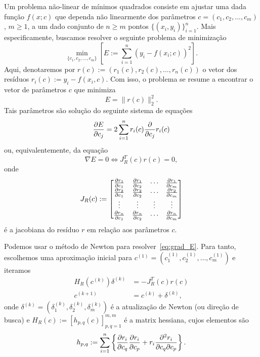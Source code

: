 Um problema não-linear de mínimos quadrados consiste em ajustar uma dada função $f(x;c)$ que dependa não linearmente dos parâmetros $c = (c_1, c_2, \dotsc, c_m)$, $m\geq 1$, a um dado conjunto de $n\geq m$ pontos $\{(x_i, y_i)\}_{i=1}^n$. Mais especificamente, buscamos resolver o seguinte problema de minimização
\begin{equation}\label{eq:prob_nlin_mq}
  \min_{\{c_1, c_2, \dotsc, c_m\}} \left[E := \sum_{i=1}^n \left(y_i - f(x_i;c)\right)^2\right].
\end{equation}
Aqui, denotaremos por $r(c) := (r_1(c), r_2(c), \dotsc, r_n(c))$ o vetor dos resíduos $r_i(c) := y_i - f(x_i,c)$. Com isso, o problema se resume a encontrar o vetor de parâmetros $c$ que minimiza
\begin{equation}
  E = \|r(c)\|_2^2.
\end{equation}
Tais parâmetros são solução do seguinte sistema de equações
\begin{equation}
  \frac{\partial E}{\partial c_j} = 2\sum_{i=1}^n r_i(c)\frac{\partial}{\partial c_j}r_i(c)
\end{equation}
ou, equivalentemente, da equação
\begin{equation}\label{eq:grad_E}
  \nabla E = 0 \Leftrightarrow J_R^T(c)r(c) = 0,
\end{equation}
onde
\begin{equation}
  J_R(c) :=
  \begin{bmatrix}
    \frac{\partial r_1}{\partial c_1} & \frac{\partial r_1}{\partial c_2} & \cdots & \frac{\partial r_1}{\partial c_m}\\
    \frac{\partial r_2}{\partial c_1} & \frac{\partial r_2}{\partial c_2} & \cdots & \frac{\partial r_2}{\partial c_m}\\
    \vdots  & \vdots & \vdots & \vdots \\
    \frac{\partial r_n}{\partial c_1} & \frac{\partial r_n}{\partial c_2} & \cdots & \frac{\partial r_n}{\partial c_m}
  \end{bmatrix}
\end{equation}
é a jacobiana do resíduo $r$ em relação aos parâmetros $c$.

Podemos usar o método de Newton para resolver~\eqref{eq:grad_E}. Para tanto, escolhemos uma aproximação inicial para $c^{(1)} = (c_1^{(1)}, c_2^{(1)}, \dotsc, c_m^{(1)})$ e iteramos
\begin{align}
  H_R(c^{(k)})\delta^{(k)} &= -J_R^T(c)r(c) \label{eq:mqnl_newton1}\\
  c^{(k+1)} &= c^{(k)} + \delta^{(k)} \label{eq:mqnl_newton2},
\end{align}
onde $\delta^{(k)} = (\delta_1^{(k)}, \delta_2^{(k)}, \delta_m^{(k)})$ é a atualização de Newton (ou direção de busca) e $H_R(c) := [h_{p,q}(c)]_{p,q=1}^{m,m}$ é a matrix hessiana, cujos elementos são
\begin{equation}
  h_{p,q} := \sum_{i=1}^n\left\{\frac{\partial r_i}{\partial c_q}\frac{\partial r_i}{\partial c_p} + r_i\frac{\partial^2 r_i}{\partial c_q\partial c_p}\right\}.
\end{equation}

